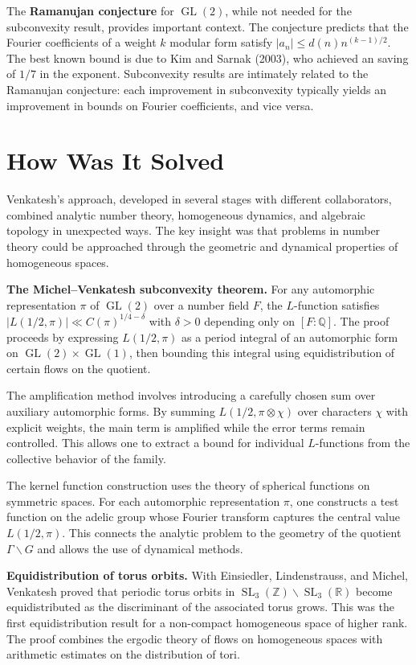 The \textbf{Ramanujan conjecture} for $\operatorname{GL}(2)$, while not needed for the subconvexity result, provides important context. The conjecture predicts that the Fourier coefficients of a weight $k$ modular form satisfy $|a_n| \le d(n) n^{(k-1)/2}$. The best known bound is due to Kim and Sarnak (2003), who achieved an saving of $1/7$ in the exponent. Subconvexity results are intimately related to the Ramanujan conjecture: each improvement in subconvexity typically yields an improvement in bounds on Fourier coefficients, and vice versa.

\section{How Was It Solved}

Venkatesh's approach, developed in several stages with different collaborators, combined analytic number theory, homogeneous dynamics, and algebraic topology in unexpected ways. The key insight was that problems in number theory could be approached through the geometric and dynamical properties of homogeneous spaces.

\textbf{The Michel--Venkatesh subconvexity theorem.} For any automorphic representation $\pi$ of $\operatorname{GL}(2)$ over a number field $F$, the $L$-function satisfies $|L(1/2, \pi)| \ll C(\pi)^{1/4 - \delta}$ with $\delta > 0$ depending only on $[F:\mathbb{Q}]$. The proof proceeds by expressing $L(1/2, \pi)$ as a period integral of an automorphic form on $\operatorname{GL}(2) \times \operatorname{GL}(1)$, then bounding this integral using equidistribution of certain flows on the quotient.

The amplification method involves introducing a carefully chosen sum over auxiliary automorphic forms. By summing $L(1/2, \pi \otimes \chi)$ over characters $\chi$ with explicit weights, the main term is amplified while the error terms remain controlled. This allows one to extract a bound for individual $L$-functions from the collective behavior of the family.

The kernel function construction uses the theory of spherical functions on symmetric spaces. For each automorphic representation $\pi$, one constructs a test function on the adelic group whose Fourier transform captures the central value $L(1/2, \pi)$. This connects the analytic problem to the geometry of the quotient $\Gamma \backslash G$ and allows the use of dynamical methods.

\textbf{Equidistribution of torus orbits.} With Einsiedler, Lindenstrauss, and Michel, Venkatesh proved that periodic torus orbits in $\operatorname{SL}_3(\mathbb{Z}) \backslash \operatorname{SL}_3(\mathbb{R})$ become equidistributed as the discriminant of the associated torus grows. This was the first equidistribution result for a non-compact homogeneous space of higher rank. The proof combines the ergodic theory of flows on homogeneous spaces with arithmetic estimates on the distribution of tori.

